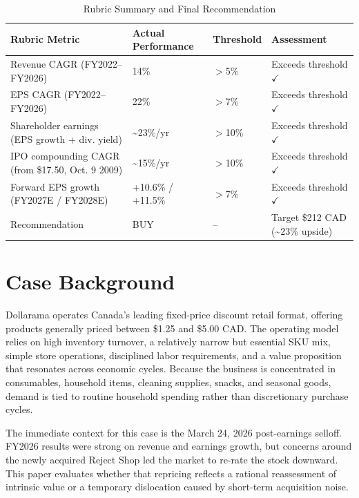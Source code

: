 \documentclass[11pt]{article}
\begin{document}
\medskip
\begin{table}[H]
\centering
\caption{Rubric Summary and Final Recommendation}
\renewcommand{\arraystretch}{1.2}
\begin{tabularx}{\linewidth}{Y C{2.5cm} C{2cm} C{3.2cm}}
\toprule
{}
Rubric Metric & Actual Performance & Threshold & Assessment \\
\midrule
Revenue CAGR (FY2022--FY2026) & 14\% & $>$5\% & Exceeds threshold $\checkmark$ \\
EPS CAGR (FY2022--FY2026) & 22\% & $>$7\% & Exceeds threshold $\checkmark$ \\
Shareholder earnings (EPS growth + div. yield) & \textasciitilde{}23\%/yr & $>$10\% & Exceeds threshold $\checkmark$ \\
IPO compounding CAGR (from \$17.50, Oct. 9 2009) & \textasciitilde{}15\%/yr & $>$10\% & Exceeds threshold $\checkmark$ \\
Forward EPS growth (FY2027E / FY2028E) & +10.6\% / +11.5\% & $>$7\% & Exceeds threshold $\checkmark$ \\
Recommendation & BUY & -- & Target \$212 CAD (\textasciitilde{}23\% upside) \\
\bottomrule
\end{tabularx}
\end{table}
\medskip

\section{Case Background}
Dollarama operates Canada's leading fixed-price discount retail format, offering products generally priced between \$1.25 and \$5.00 CAD. The operating model relies on high inventory turnover, a relatively narrow but essential SKU mix, simple store operations, disciplined labor requirements, and a value proposition that resonates across economic cycles. Because the business is concentrated in consumables, household items, cleaning supplies, snacks, and seasonal goods, demand is tied to routine household spending rather than discretionary purchase cycles.

The immediate context for this case is the March 24, 2026 post-earnings selloff. FY2026 results were strong on revenue and earnings growth, but concerns around the newly acquired Reject Shop led the market to re-rate the stock downward. This paper evaluates whether that repricing reflects a rational reassessment of intrinsic value or a temporary dislocation caused by short-term acquisition noise.
\end{document}
